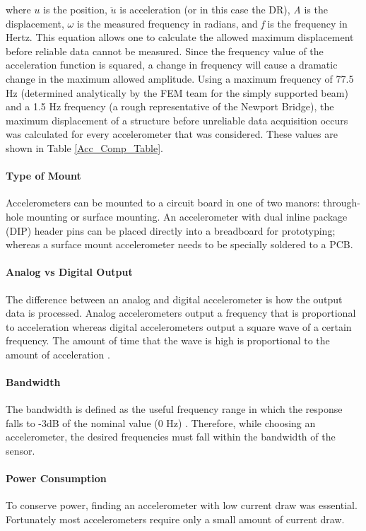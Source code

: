 \noindent where $u$ is the position, $\ddot{u}$ is acceleration (or in this case the DR), \textit{A} is the displacement, $\omega$ is the measured frequency in radians, and \textit{f} is the frequency in Hertz.  This equation allows one to calculate the allowed maximum displacement before reliable data cannot be measured.  Since the frequency value of the acceleration function is squared, a change in frequency will cause a dramatic change in the maximum allowed amplitude.  Using a maximum frequency of 77.5 Hz (determined analytically by the FEM team for the simply supported beam) and a 1.5 Hz frequency (a rough representative of the Newport Bridge), the maximum displacement of a structure before unreliable data acquisition occurs was calculated for every accelerometer that was considered.  These values are shown in Table \ref{Acc_Comp_Table}.

\paragraph{Type of Mount}
\indent Accelerometers can be mounted to a circuit board in one of two manors: through-hole mounting or surface mounting.  An accelerometer with dual inline package (DIP) header pins can be placed directly into a breadboard for prototyping; whereas a surface mount accelerometer needs to be specially soldered to a PCB.
\paragraph{Analog vs Digital Output}
\indent The difference between an analog and digital accelerometer is how the output data is processed.  Analog accelerometers output a frequency that is proportional to acceleration whereas digital accelerometers output a square wave of a certain frequency.  The amount of time that the wave is high is proportional to the amount of acceleration \cite{DimensionEngineering}. 
\paragraph{Bandwidth}
\indent The bandwidth is defined as the useful frequency range in which the response falls to -3dB of the nominal value (0 Hz) \cite{MSY.SivaPrasad:2011}.  Therefore, while choosing an accelerometer, the desired frequencies must fall within the bandwidth of the sensor.   
\paragraph{Power Consumption}
\indent To conserve power, finding an accelerometer with low current draw was essential.  Fortunately most accelerometers require only a small amount of current draw.

